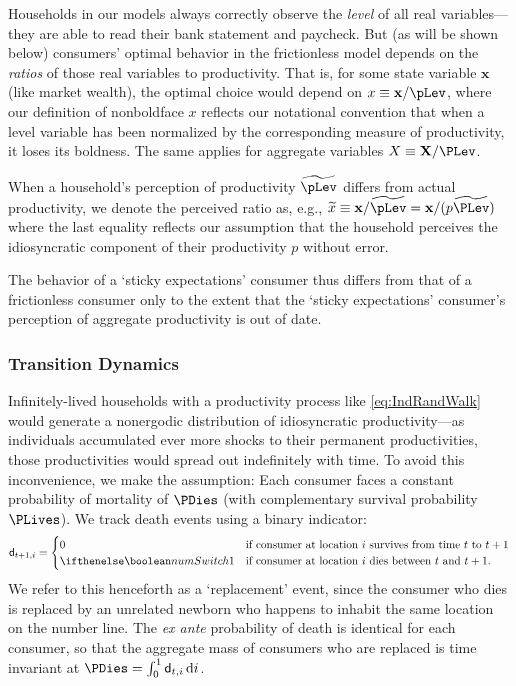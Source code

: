 \documentclass[titlepage]{\econtex}\newcommand{\texname}{cAndCwithStickyE}
\begin{document}
Households in our models always correctly observe the \textit{level} of all real variables---they are able to read their bank statement and paycheck. But (as will be shown below) consumers' optimal behavior in the frictionless model depends on the {\it ratios} of those real variables to productivity.  That is, for some state variable $\textbf{x}$ (like market wealth), the optimal choice would depend on ${x} \equiv \mathbf{x}/{\pLev}$, where our definition of nonboldface ${x}$ reflects our notational convention that when a level variable has been normalized by the corresponding measure of productivity, it loses its boldness.  The same applies for aggregate variables ${X} \equiv \mathbf{X}/{\PLev}$.

When a household's perception of productivity $\perc{\pLev}$ differs from actual productivity, we denote the perceived ratio as, e.g., $\perc{x} \equiv \mathbf{x}/\perc{\pLev} = \mathbf{x}/({p}\perc{\PLev})$ where the last equality reflects our assumption that the household perceives the idiosyncratic component of their productivity ${p}$ without error.

The behavior of a `sticky expectations' consumer thus differs from that of a frictionless consumer only to the extent that the `sticky expectations' consumer's perception of aggregate productivity is out of date.

\subsubsection{Transition Dynamics}

Infinitely-lived households with a productivity process like \eqref{eq:IndRandWalk} would generate a nonergodic distribution of idiosyncratic productivity---as individuals accumulated ever more shocks to their permanent productivities, those productivities would spread out indefinitely with time. To avoid this inconvenience, we make the \cite{blanchardFinite} assumption: Each consumer faces a constant probability of mortality of $\PDies$ (with complementary survival probability $\PLives$). %
We track death events using a binary indicator:
\begin{equation*}
\pDies_{t+1,i} =
  \begin{cases}
    0 & \text{if consumer at location $i$ survives from time $t$ to $t+1$}
\\ \ifnumSw  1 & \text{if consumer at location $i$ dies between $t$ and $t+1$}.
  \end{cases}
\end{equation*}
We refer to this henceforth as a `replacement' event, since the consumer who dies is replaced by an unrelated newborn who happens to inhabit the same location on the number line.  The {\it ex ante} probability of death is identical for each consumer, so that the aggregate mass of consumers who are replaced is time invariant at $\PDies = \int_{0}^{1} \pDies_{t,i}\,\text{d}i$.
\end{document}
